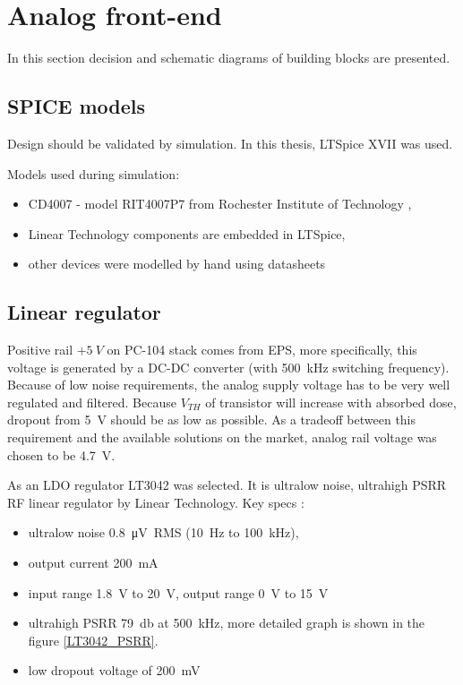 \section{Analog front-end}
    In this section decision and schematic diagrams of building blocks are presented.

    \subsection{SPICE models}
        Design should be validated by simulation. In this thesis, LTSpice XVII was used.

        Models used during simulation:
        \begin{itemize}
            \item CD4007 - model RIT4007P7 from Rochester Institute of Technology \cite{RIT_FULLER},
            \item Linear Technology components are embedded in LTSpice,
            \item other devices were modelled by hand using datasheets
        \end{itemize}

    \subsection{Linear regulator}
        Positive rail $+\SI{5}{V}$ on PC-104 stack comes from EPS, more specifically, this voltage is generated by a DC-DC converter (with \SI{500}{\kilo\hertz} switching frequency). Because of low noise requirements, the analog supply voltage has to be very well regulated and filtered. Because $V_{TH}$ of transistor will increase with absorbed dose, dropout from \SI{5}{\volt} should be as low as possible. As a tradeoff between this requirement and the available solutions on the market, analog rail voltage was chosen to be \SI{4.7}{\volt}.

        As an LDO regulator LT3042 was selected. It is ultralow noise, ultrahigh PSRR RF linear regulator by Linear Technology. Key specs \cite{LT3042_datasheet}:
        \begin{itemize}
            \item ultralow noise \SI{0.8}{\micro\volt RMS} (\SI{10}{\hertz} to \SI{100}{\kilo\hertz}),
            \item output current \SI{200}{\milli\ampere}
            \item input range \SI{1.8}{\volt} to \SI{20}{\volt}, output range \SI{0}{\volt} to \SI{15}{\volt}
            \item ultrahigh PSRR \SI{79}{\decibel} at \SI{500}{\kilo\hertz}, more detailed graph is shown in the figure \ref{LT3042_PSRR}.
            \item low dropout voltage of \SI{200}{\mV}
        \end{itemize}

